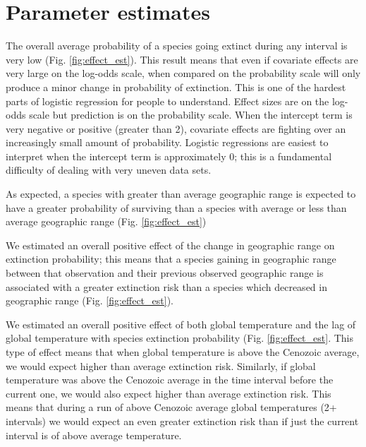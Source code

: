\documentclass[12pt,letterpaper]{article}
\begin{document}
\section{Parameter estimates}

The overall average probability of a species going extinct during any interval is very low (Fig. \ref{fig:effect_est}). This result means that even if covariate effects are very large on the log-odds scale, when compared on the probability scale will only produce a minor change in probability of extinction. This is one of the hardest parts of logistic regression for people to understand. Effect sizes are on the log-odds scale but prediction is on the probability scale. When the intercept term is very negative or positive (greater than 2), covariate effects are fighting over an increasingly small amount of probability. Logistic regressions are easiest to interpret when the intercept term is approximately 0; this is a fundamental difficulty of dealing with very uneven data sets.

As expected, a species with greater than average geographic range is expected to have a greater probability of surviving than a species with average or less than average geographic range (Fig. \ref{fig:effect_est})

We estimated an overall positive effect of the change in geographic range on extinction probability; this means that a species gaining in geographic range between that observation and their previous observed geographic range is associated with a greater extinction risk than a species which decreased in geographic range (Fig. \ref{fig:effect_est}).

We estimated an overall positive effect of both global temperature and the lag of global temperature with species extinction probability (Fig. \ref{fig:effect_est}. This type of effect means that when global temperature is above the Cenozoic average, we would expect higher than average extinction risk. Similarly, if global temperature was above the Cenozoic average in the time interval before the current one, we would also expect higher than average extinction risk. This means that during a run of above Cenozoic average global temperatures (2+ intervals) we would expect an even greater extinction risk than if just the current interval is of above average temperature.
\end{document}
